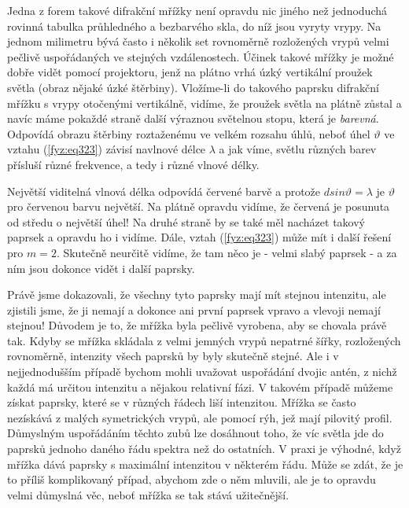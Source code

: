 {    Jedna z forem takové difrakční mřížky není opravdu nic jiného než jednoduchá rovinná tabulka 
    průhledného a bezbarvého skla, do níž jsou vyryty vrypy. Na jednom milimetru bývá často i 
    několik set rovnoměrně rozložených vrypů velmi pečlivě uspořádaných ve stejných vzdálenostech. 
    Účinek takové mřížky je možné dobře vidět pomocí projektoru, jenž na plátno vrhá úzký 
    vertikální proužek světla (obraz nějaké úzké štěrbiny). Vložíme-li do takového paprsku 
    difrakční mřížku s vrypy otočenými vertikálně, vidíme, že proužek světla na plátně zůstal a 
    navíc máme pokaždé straně další výraznou světelnou stopu, která je \emph{barevná}. Odpovídá 
    obrazu štěrbiny roztaženému ve velkém rozsahu úhlů, neboť úhel \(\vartheta\) ve vztahu 
    (\ref{fyz:eq323}) závisí navlnové délce \(\lambda\) a jak víme, světlu různých barev přísluší 
    různé frekvence, a tedy i různé vlnové délky.
    
    Největší viditelná vlnová délka odpovídá červené barvě a protože \(dsin\vartheta= \lambda\) je 
    \(\vartheta\) pro červenou barvu největší. Na plátně opravdu vidíme, že červená je posunuta od 
    středu o největší úhel! Na druhé straně by se také měl nacházet takový paprsek a opravdu ho i 
    vidíme. Dále, vztah (\ref{fyz:eq323}) může mít i další řešení pro \(m = 2\). Skutečně neurčitě 
    vidíme, že tam něco je - velmi slabý paprsek - a za ním jsou dokonce vidět i další paprsky.
    
    Právě jsme dokazovali, že všechny tyto paprsky mají mít stejnou intenzitu, ale zjistili jsme, 
    že ji nemají a dokonce ani první paprsek vpravo a vlevoji nemají stejnou! Důvodem je to, že 
    mřížka byla pečlivě vyrobena, aby se chovala právě tak. Kdyby se mřížka skládala z velmi 
    jemných vrypů nepatrné šířky, rozložených rovnoměrně, intenzity všech paprsků by byly skutečně 
    stejné. Ale i v nejjednodušším případě bychom mohli uvažovat uspořádání dvojic antén, z nichž 
    každá má určitou intenzitu a nějakou relativní fázi. V takovém případě můžeme získat paprsky, 
    které se v různých řádech liší intenzitou. Mřížka se často nezískává z malých symetrických 
    vrypů, ale pomocí rýh, jež mají pilovitý profil. Důmyslným uspořádáním těchto zubů lze 
    dosáhnout toho, že víc světla jde do paprsků jednoho daného řádu spektra než do ostatních. V 
    praxi je výhodné, když mřížka dává paprsky s maximální intenzitou v některém řádu. Může se 
    zdát, že je to příliš komplikovaný případ, abychom zde o něm mluvili, ale je to opravdu velmi 
    důmyslná věc, neboť mřížka se tak stává užitečnější.
    
}
